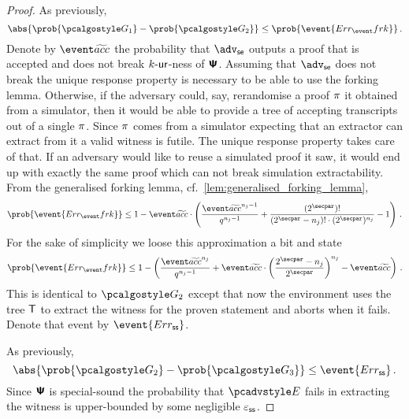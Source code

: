 \let\accentvec\vec \documentclass[runningheads,10pt]{llncs}
\begin{document}
\begin{proof}
	As previously, 
	\[
		\abs{\prob{\game{1}} - \prob{\game{2}}} \leq \prob{\event{\errfrk}}\,.
	\]
	Denote by $\waccProb$ the probability that $\advse$ outputs a proof that is
  accepted and does not break ${k\text{-}\mathsf{ur}}$-ness of $\bm{\mathsf{\Psi}}$.
  Assuming that $\advse$ does not break the unique response property is
	necessary to be able to use the forking lemma. Otherwise, if the adversary
	could, say, rerandomise a proof $\pi$ it obtained from a simulator,
	then it would be able to provide a tree of accepting transcripts out of a
	single $\pi$. Since $\pi$ comes from a simulator expecting that an
	extractor can extract from it a valid witness is futile. The unique
	response property takes care of that. If an adversary would like to reuse
	a simulated proof it saw, it would end up with exactly the same proof
	which can not break simulation extractability.
	From the generalised forking lemma,
	cf.~\cref{lem:generalised_forking_lemma}, \[
		\prob{\event{\errfrk}} \leq 1 -
		\waccProb \cdot \left(\frac{\waccProb^{n_j - 1}}{q^{n_j - 1}} +
		\frac{(2^\secpar) !}{(2^\secpar - n_j)! \cdot
	(2^\secpar)^{n_j}} - 1\right)\,.
\]
For the sake of simplicity we loose this approximation a bit and state
\[
		\prob{\event{\errfrk}} \leq 1 -
		\left(\frac{\waccProb^{n_j}}{q^{n_j - 1}} +
			\waccProb \cdot \left(\frac{2^\secpar - n_j}{2^\secpar}\right)^{n_j} -
		\waccProb\right)\,.
\]
	This is identical to $\game{2}$ except that now the environment uses the
	tree $\mathsf{T}$ to extract the witness for the proven statement and aborts when
	it fails. Denote that event by $\event{\errss}$.
	
	As previously, 
	\[
		\abs{\prob{\game{2}} - \prob{\game{3}}} \leq \event{\errss}\,.
	\]
	Since $\bm{\mathsf{\Psi}}$ is special-sound the probability that $\env$ fails in extracting
	the witness is upper-bounded by some negligible $\varepsilon_{\mathsf{ss}}$.
	

\end{proof}
\end{document}
